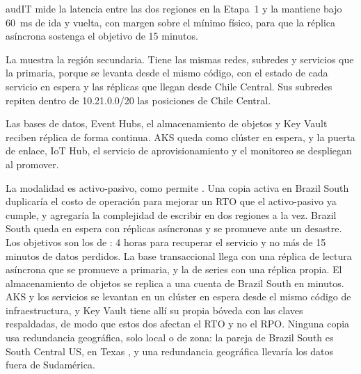 \begin{compromiso}[metrica={Latencia de ida y vuelta entre Chile Central y Brazil South bajo 60 ms}, verifica={Medición en la Etapa 1, antes del hito H5}, fuente={Mínimo físico de 26 ms calculado en esta sección}]
audIT mide la latencia entre las dos regiones en la Etapa~1 y la mantiene bajo 60~ms de ida y vuelta,
con margen sobre el mínimo físico, para que la réplica asíncrona sostenga el objetivo de 15 minutos.
\end{compromiso}

La  muestra la región secundaria. Tiene las mismas redes, subredes y servicios
que la primaria, porque se levanta desde el mismo código, con el estado de cada servicio en espera y las
réplicas que llegan desde Chile Central. Sus subredes repiten dentro de 10.21.0.0/20 las posiciones de
Chile Central.


Las bases de datos, Event Hubs, el almacenamiento de objetos y Key Vault reciben réplica de forma
continua. AKS queda como clúster en espera, y la puerta de enlace, IoT Hub, el servicio de
aprovisionamiento y el monitoreo se despliegan al promover.

La modalidad es activo-pasivo, como permite . Una copia activa en Brazil South
duplicaría el costo de operación para mejorar un RTO que el activo-pasivo ya cumple, y agregaría la
complejidad de escribir en dos regiones a la vez. Brazil South queda en espera con réplicas asíncronas y
se promueve ante un desastre. Los objetivos son los de : 4 horas para recuperar el
servicio y no más de 15 minutos de datos perdidos. La base transaccional llega con una réplica de lectura asíncrona que se
promueve a primaria, y la de series con una réplica propia. El almacenamiento de objetos se replica a
una cuenta de Brazil South en minutos. AKS y los servicios se levantan en un clúster en espera desde el
mismo código de infraestructura, y Key Vault tiene allí su propia bóveda con las claves respaldadas, de
modo que estos dos afectan el RTO y no el RPO. Ninguna copia usa redundancia geográfica, solo local o de
zona: la pareja de Brazil South es South Central US, en Texas \parencite{ms_regions}, y una redundancia
geográfica llevaría los datos fuera de Sudamérica.

